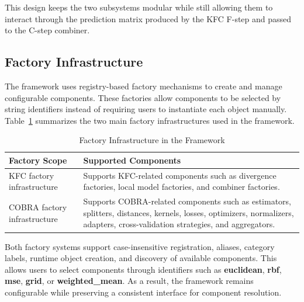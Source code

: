 This design keeps the two subsystems modular while still allowing them to interact through the prediction matrix produced by the KFC F-step and passed to the C-step combiner.

\subsection{Factory Infrastructure}

\hs The framework uses registry-based factory mechanisms to create and manage configurable components. These factories allow components to be selected by string identifiers instead of requiring users to instantiate each object manually. Table~\ref{tab:factory_infrastructure} summarizes the two main factory infrastructures used in the framework.

\begin{table}[H]
      \centering
      \caption{Factory Infrastructure in the Framework}
      \label{tab:factory_infrastructure}
      \renewcommand{\arraystretch}{1.2}
      \begin{tabularx}{\textwidth}{
                  >{\raggedright\arraybackslash}p{3.4cm}
                  >{\raggedright\arraybackslash}X
            }
            \toprule
            \textbf{Factory Scope}       & \textbf{Supported Components}                                                                                                                  \\
            \midrule
            KFC factory infrastructure   &
            Supports KFC-related components such as divergence factories, local model factories, and combiner factories.                                                                  \\

            COBRA factory infrastructure &
            Supports COBRA-related components such as estimators, splitters, distances, kernels, losses, optimizers, normalizers, adapters, cross-validation strategies, and aggregators. \\
            \bottomrule
      \end{tabularx}
\end{table}

Both factory systems support case-insensitive registration, aliases, category labels, runtime object creation, and discovery of available components. This allows users to select components through identifiers such as \textbf{euclidean}, \textbf{rbf}, \textbf{mse}, \textbf{grid}, or \textbf{weighted\_mean}. As a result, the framework remains configurable while preserving a consistent interface for component resolution.

